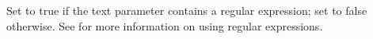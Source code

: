     Set to true if the text parameter contains a regular
    expression; set to false otherwise. See 
    for more information on using regular expressions.